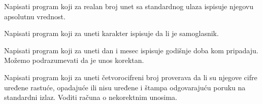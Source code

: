\begin{Exercise}[label=v1.2_10] 
Napisati program koji za realan broj unet sa standardnog ulaza
ispisuje njegovu apsolutnu vrednost.
\end{Exercise}
\begin{Answer}[ref=v1.2_10]
\end{Answer}

\begin{Exercise}[label=v1.2_11] 
Napisati program koji za uneti karakter ispisuje
da li je samoglasnik.
\end{Exercise}
\begin{Answer}[ref=v1.2_11]
\end{Answer}

\begin{Exercise}[label=v1.2_12] 
Napisati program koji za uneti dan i mesec ispisuje godišnje doba kom
pripadaju. Možemo podrazumevati da je unos korektan. 
\end{Exercise}
\begin{Answer}[ref=v1.2_12]
\end{Answer}

\begin{Exercise}[label=v1.2_13] 
Napisati program koji za uneti četvorocifreni broj proverava
da li su njegove cifre uređene rastuće, opadajuće ili nisu
uređene i štampa odgovarajuću poruku na standardni
izlaz. Voditi računa o nekorektnim unosima.
\end{Exercise}
\begin{Answer}[ref=v1.2_13]
\end{Answer}

